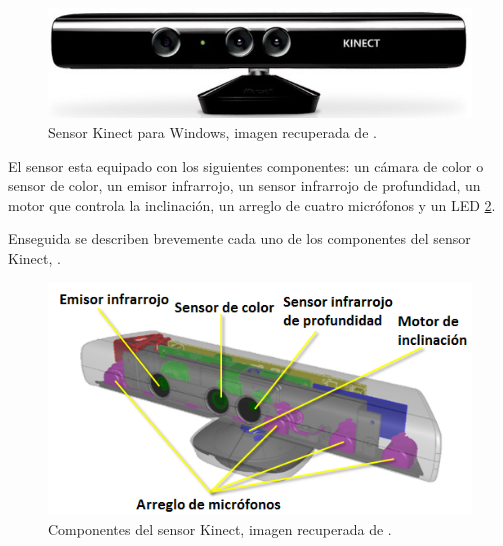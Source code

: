 \begin{figure}[h!]
\begin{center}
\includegraphics[scale=.60]{./Figures/Kinect.jpg}
\end{center}
\caption{Sensor Kinect para Windows, imagen recuperada de \footnotemark{}.}
\label{fig:KinectPic}
\end{figure} 


El sensor esta equipado con los siguientes componentes: un cámara de color o sensor de color, un emisor infrarrojo, un sensor infrarrojo de profundidad, un motor que controla la inclinación, un arreglo de cuatro micrófonos y un LED \ref{fig:KinectComponentes}. 

Enseguida se describen brevemente cada uno de los componentes del sensor Kinect, \citep{Jana2013}. 
\begin{figure}[h!]
\begin{center}
\includegraphics[scale=.6]{./Figures/sensor.png}
\end{center}
\caption{Componentes del sensor Kinect, imagen recuperada de \footnotemark{}.} 
\label{fig:KinectComponentes}
\end{figure}   


